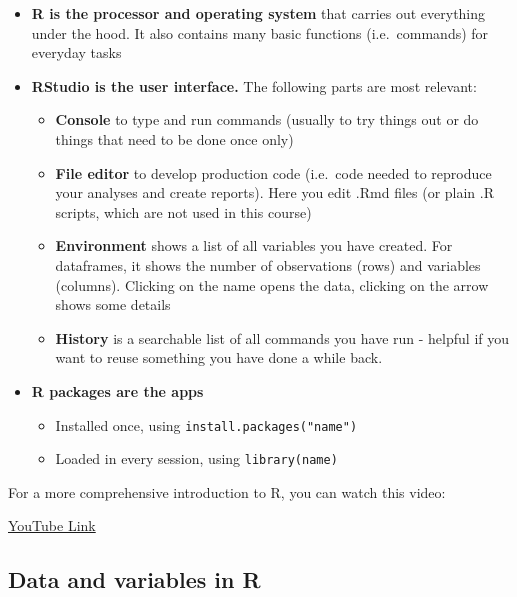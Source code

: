 \documentclass[
]{book}
\providecommand{\tightlist}{%
  \setlength{\itemsep}{0pt}\setlength{\parskip}{0pt}}
\begin{document}
\begin{itemize}
\item
  \textbf{R is the processor and operating system} that carries out everything under the hood. It also contains many basic functions (i.e.~commands) for everyday tasks
\item
  \textbf{RStudio is the user interface.} The following parts are most relevant:

  \begin{itemize}
  \tightlist
  \item
    \textbf{Console} to type and run commands (usually to try things out or do things that need to be done once only)
  \item
    \textbf{File editor} to develop production code (i.e.~code needed to reproduce your analyses and create reports). Here you edit .Rmd files (or plain .R scripts, which are not used in this course)
  \item
    \textbf{Environment} shows a list of all variables you have created. For dataframes, it shows the number of observations (rows) and variables (columns). Clicking on the name opens the data, clicking on the arrow shows some details
  \item
    \textbf{History} is a searchable list of all commands you have run - helpful if you want to reuse something you have done a while back.
  \end{itemize}
\item
  \textbf{R packages are the apps}

  \begin{itemize}
  \tightlist
  \item
    Installed once, using \texttt{install.packages("name")}
  \item
    Loaded in every session, using \texttt{library(name)}
  \end{itemize}
\end{itemize}

For a more comprehensive introduction to R, you can watch this video:

\textcolor{blue}{\href{https://www.youtube.com/embed/kvaMhkQF0H4?rel=0&modestbranding=1&loop=1&playlist=sk7TT5qM5Hw}{YouTube Link}}

\hypertarget{data-and-variables-in-r}{%
\subsection{Data and variables in R}\label{data-and-variables-in-r}}
\end{document}
